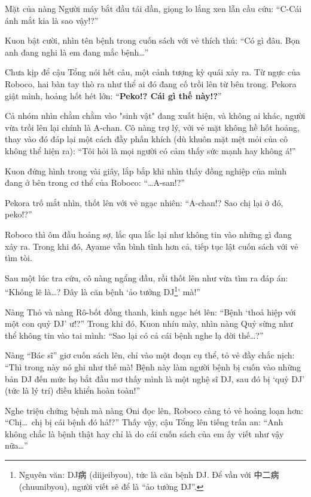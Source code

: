 \documentclass[../main.tex]{subfiles}
\begin{document}
Mặt của nàng Người máy bắt đầu tái dần, giọng lo lắng xen lẫn cầu cứu: ``C-Cái ánh mắt kia là sao vậy!?''

Kuon bật cười, nhìn tên bệnh trong cuốn sách với vẻ thích thú: ``Có gì đâu. Bọn anh đang nghi là em đang mắc bệnh\dots''

Chưa kịp để cậu Tổng nói hết câu, một cảnh tượng kỳ quái xảy ra. Từ ngực của Roboco, hai bàn tay thò ra như thể ai đó đang cố trồi lên từ bên trong. Pekora giật mình, hoảng hốt hét lớn: ``\textbf{Peko!? Cái gì thế này!?}''

Cả nhóm nhìn chằm chằm vào "sinh vật" đang xuất hiện, và không ai khác, người vừa trồi lên lại chính là A-chan. Cô nàng trợ lý, với vẻ mặt không hề hốt hoảng, thay vào đó đáp lại một cách đầy phấn khích (dù khuôn mặt mệt mỏi của cô không thể hiện ra): ``Tôi hỏi là mọi người có cảm thấy sức mạnh hay không á!''

Kuon đứng hình trong vài giây, lắp bắp khi nhìn thấy đồng nghiệp của mình đang ở bên trong cơ thể của Roboco: ``\dots A-san!?''

Pekora trố mắt nhìn, thốt lên với vẻ ngạc nhiên: ``A-chan!? Sao chị lại ở đó, peko!?''

Roboco thì ôm đầu hoảng sợ, lắc qua lắc lại như không tin vào những gì đang xảy ra. Trong khi đó, Ayame vẫn bình tĩnh hơn cả, tiếp tục lật cuốn sách với vẻ tìm tòi.

Sau một lúc tra cứu, cô nàng ngẩng đầu, rồi thốt lên như vừa tìm ra đáp án: ``Không lẽ là\dots? Đây là căn bệnh `ảo tưởng DJ\footnote{Nguyên văn: DJ病 (diijeibyou), tức là căn bệnh DJ. Để vần với 中二病 (chuunibyou), người viết sẽ để là ``ảo tưởng DJ''.}' mà!''

Nàng Thỏ và nàng Rô-bốt đồng thanh, kinh ngạc hét lên: ``Bệnh `thoả hiệp với một con quỷ DJ' ư!?'' Trong khi đó, Kuon nhíu mày, nhìn nàng Quỷ sừng như thể không tin vào tai mình: ``Sao lại có cả cái bệnh nghe lạ đời thế\dots?''

Nàng ``Bác sĩ'' giơ cuốn sách lên, chỉ vào một đoạn cụ thể, tỏ vẻ đầy chắc nịch: ``Thì trong này nó ghi như thế mà! Bệnh này làm người bệnh bị cuốn vào những bản DJ đến mức họ bắt đầu mơ thấy mình là một nghệ sĩ DJ, sau đó bị `quỷ DJ' (tức là lý trí) điều khiển hoàn toàn!''

Nghe triệu chứng bệnh mà nàng Oni đọc lên, Roboco càng tỏ vẻ hoảng loạn hơn: ``Chị\dots\ chị bị cái bệnh đó hả!?'' Thấy vậy, cậu Tổng lên tiếng trấn an: ``Anh không chắc là bệnh thật hay chỉ là do cái cuốn sách của em ấy viết như vậy nữa\dots''
\end{document}

